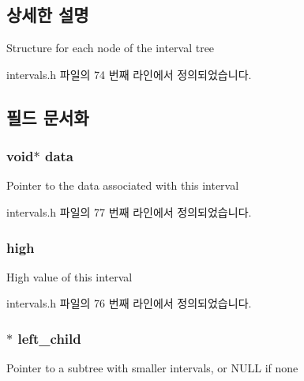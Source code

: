 \subsection{상세한 설명}
Structure for each node of the interval tree 

intervals.\+h 파일의 74 번째 라인에서 정의되었습니다.



\subsection{필드 문서화}
\subsubsection[{\texorpdfstring{data}{data}}]{\setlength{\rightskip}{0pt plus 5cm}void$\ast$ data}\hypertarget{structinterval__node_a735984d41155bc1032e09bece8f8d66d}{}\label{structinterval__node_a735984d41155bc1032e09bece8f8d66d}
Pointer to the data associated with this interval 

intervals.\+h 파일의 77 번째 라인에서 정의되었습니다.

\subsubsection[{\texorpdfstring{high}{high}}]{ high}\hypertarget{structinterval__node_a0d90a9fe74bca2dccde7f81cddfdf7b0}{}\label{structinterval__node_a0d90a9fe74bca2dccde7f81cddfdf7b0}
High value of this interval 

intervals.\+h 파일의 76 번째 라인에서 정의되었습니다.

\subsubsection[{\texorpdfstring{left\+\_\+child}{left_child}}]{$\ast$ left\+\_\+child}\hypertarget{structinterval__node_a6a3f189bd13197563c4edd38008e5ad5}{}\label{structinterval__node_a6a3f189bd13197563c4edd38008e5ad5}
Pointer to a subtree with smaller intervals, or N\+U\+LL if none 

